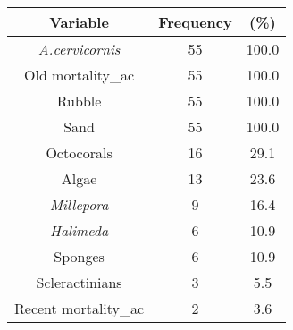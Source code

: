 \captionsetup[table]{labelformat=empty,skip=1pt}
\begin{longtable}{ccc}
\toprule
\textbf{Variable} & \textbf{Frequency} & \textbf{(\%)} \\ 
\midrule
\textit{A.cervicornis} & 55 & 100.0 \\ 
Old mortality\_ac & 55 & 100.0 \\ 
Rubble & 55 & 100.0 \\ 
Sand & 55 & 100.0 \\ 
Octocorals & 16 & 29.1 \\ 
Algae & 13 & 23.6 \\ 
\textit{Millepora} & 9 & 16.4 \\ 
\textit{Halimeda} & 6 & 10.9 \\ 
Sponges & 6 & 10.9 \\ 
Scleractinians & 3 & 5.5 \\ 
Recent mortality\_ac & 2 & 3.6 \\ 
\bottomrule
\end{longtable}

